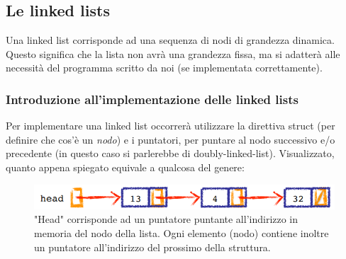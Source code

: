 \documentclass[12pt]{article}
\begin{document}
\subsection{Le linked lists}
\label{ssec:linked_lists}
Una linked list corrisponde ad una sequenza di nodi di grandezza dinamica.
Questo significa che la lista non avrà una grandezza fissa, ma si adatterà alle necessità del programma scritto da noi (se implementata correttamente).

\subsubsection{Introduzione all'implementazione delle linked lists}
\label{sssec:linked_lists_introduction}
Per implementare una linked list occorrerà utilizzare la direttiva struct (per definire che cos'è un \textit{nodo})
e i puntatori, per puntare al nodo successivo e/o precedente (in questo caso si parlerebbe di doubly-linked-list).
Visualizzato, quanto appena spiegato equivale a qualcosa del genere:
\begin{figure}[H]
    \centering
    \includegraphics[width=.9\linewidth,height=.40\textheight,keepaspectratio]{linked_list_visualized.png} %
    \begin{center}
        \caption{\label{fig:} "Head" corrisponde ad un puntatore puntante all'indirizzo in memoria del nodo della lista. Ogni elemento (nodo) contiene inoltre un puntatore all'indirizzo del prossimo della struttura.} %
    \end{center}
\end{figure}
\end{document}
